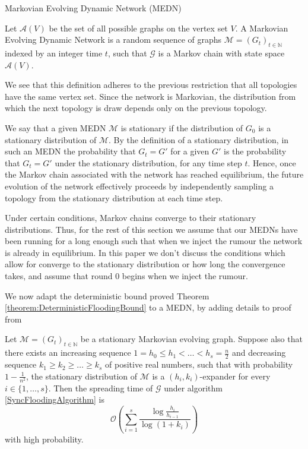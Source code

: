 \label{subsection:MEDNBound}

\begin{definition}
	Markovian Evolving Dynamic Network (MEDN)

	\noindent 
	Let $\mathcal{A}(V)$ be the set of all possible graphs on the vertex set $V$.
	A Markovian Evolving Dynamic Network is a random sequence of graphs $\mathcal{M} = (G_t)_{t \in \mathbb{N}}$ indexed by an integer time $t$, such that $\mathcal{G}$ is a Markov chain with state space $\mathcal{A}(V)$.
\end{definition}

We see that this definition adheres to the previous restriction that all topologies have the same vertex set. Since the network is Markovian, the distribution from which the next topology is draw depends only on the previous topology.

We say that a given MEDN $\mathcal{M}$ is stationary if the distribution of $G_0$ is a stationary distribution of $\mathcal{M}$. By the definition of a stationary distribution, in such an MEDN the probability that $G_t = G'$ for a given $G'$ is the probability that $G_t = G'$ under the stationary distribution, for any time step $t$. Hence, once the Markov chain associated with the network has reached equilibrium, %
the future evolution of the network effectively proceeds by independently sampling a topology from the stationary distribution at each time step. %

Under certain conditions, Markov chains converge to their stationary distributions. Thus, for the rest of this section we assume that our MEDNs have been running for a long enough such that when we inject the rumour the network is already in equilibrium. In this paper we don't discuss the conditions which allow for converge to the stationary distribution or how long the convergence takes, and assume that round 0 begins when we inject the rumour.

We now adapt the deterministic bound proved Theorem \ref{theorem:DeterministicFloodingBound} to a MEDN, by adding details to proof from \cite{syncPaper}


\begin{theorem}\label{theorem:markovSyncBound}
	Let $\mathcal{M} = (G_t)_{t \in \mathbb{N}}$  be a stationary Markovian evolving graph. Suppose also that there exists an increasing sequence $1 = h_0 \leq h_1 < \dots < h_s = \frac{n}{2}$ and decreasing sequence $k_1 \geq k_2 \geq \dots \geq k_s$ of positive real numbers, such that with probability $1-\frac{1}{n^2}$, the stationary distribution of $\mathcal{M}$ is a $(h_i, k_i)$-expander for every $i \in \{1, \dots , s\}$. Then the spreading time of $\mathcal{G}$ under algorithm \ref{SyncFloodingAlgorithm} is
	$$
		\mathcal{O}\left(\sum_{i=1}^s \frac{\log \frac{h_i}{h_{i-1}}}{\log(1+k_i)}\right)
	$$
	with high probability.
\end{theorem}

